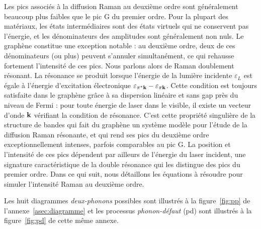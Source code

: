 Les pics associés à la diffusion Raman au deuxième ordre sont généralement beaucoup plus faibles que le pic G du premier ordre. Pour la plupart des matériaux, les états intermédiaires sont des états virtuels qui ne conservent pas l'énergie, et les dénominateurs des amplitudes sont généralement non nuls. Le graphène constitue une exception notable : au deuxième ordre, deux de ces dénominateurs (ou plus) peuvent s'annuler simultanément, ce qui rehausse fortement l'intensité de ces pics. Nous parlons alors de Raman doublement résonant. La résonance se produit lorsque l'énergie de la lumière incidente $\varepsilon_L$ est égale à l'énergie d'excitation électronique $\varepsilon_{\pi^*\mathbf{k}} - \varepsilon_{\pi\mathbf{k}}$. Cette condition est toujours satisfaite dans le graphène grâce à sa dispersion linéaire et sans gap près du niveau de Fermi : pour toute énergie de laser dans le visible, il existe un vecteur d'onde $\mathbf{k}$ vérifiant la condition de résonance. C'est cette propriété singulière de la structure de bandes qui fait du graphène un système modèle pour l'étude de la diffusion Raman résonante, et qui rend ses pics du deuxième ordre exceptionnellement intenses, parfois comparables au pic G. La position et l'intensité de ces pics dépendent par ailleurs de l'énergie du laser incident, une signature caractéristique de la double résonance qui les distingue des pics du premier ordre. Dans ce qui suit, nous détaillons les équations à résoudre pour simuler l'intensité Raman au deuxième ordre.

Les huit diagrammes \textit{deux-phonons} possibles sont illustrés à la figure~\ref{fig:pp} de l'annexe~\ref{asec:diagramme} et les processus \textit{phonon-défaut} (pd) sont illustrés à la figure~\ref{fig:pd} de cette même annexe.

